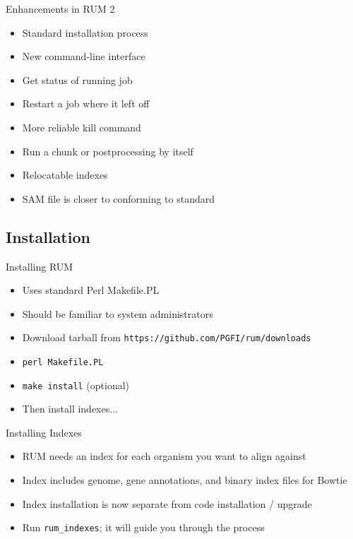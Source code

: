 \documentclass{beamer}
\begin{document}
\begin{frame}{Enhancements in RUM 2}
  \begin{itemize}
  \item Standard installation process
  \item New command-line interface
  \item Get status of running job
  \item Restart a job where it left off
  \item More reliable kill command
  \item Run a chunk or postprocessing by itself
  \item Relocatable indexes
  \item SAM file is closer to conforming to standard
  \end{itemize}
\end{frame}

\subsection{Installation}

\begin{frame}{Installing RUM}
  \begin{itemize}
  \item Uses standard Perl Makefile.PL
  \item Should be familiar to system administrators
  \item Download tarball from \texttt{https://github.com/PGFI/rum/downloads}
  \item \texttt{perl Makefile.PL}
  \item \texttt{make install} (optional)
  \item Then install indexes...
  \end{itemize}
\end{frame}

\begin{frame}{Installing Indexes}
  \begin{itemize}
  \item RUM needs an index for each organism you want to align against
  \item Index includes genome, gene annotations, and binary index files for Bowtie
  \item Index installation is now separate from code installation / upgrade
  \item Run \texttt{rum\_indexes}; it will guide you through the process
  \end{itemize}
\end{frame}
\end{document}
